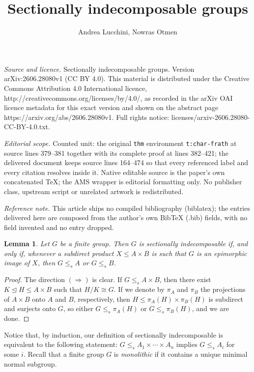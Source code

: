 \documentclass[10pt,a4paper]{amsart}
\newtheorem{lemma}[thm]{Lemma}
\begin{document}
\title[Sectionally indecomposable groups]{Sectionally indecomposable groups}
\author{Andrea Lucchini, Nowras Otmen}
\date{}
\maketitle
\noindent\emph{Source and licence.} Sectionally indecomposable groups. Version arXiv:2606.28080v1 (CC BY 4.0). This material is distributed under the Creative Commons Attribution 4.0 International licence, http://creativecommons.org/licenses/by/4.0/, as recorded in the arXiv OAI licence metadata for this exact version and shown on the abstract page https://arxiv.org/abs/2606.28080v1. Full rights notice: licenses/arxiv-2606.28080-CC-BY-4.0.txt.\par\smallskip
\noindent\textit{Editorial scope.} Counted unit: the original \texttt{thm} environment \texttt{t:char-frath} at source lines 379--381 together with its complete proof at lines 382--421; the delivered document keeps source lines 164--474 so that every referenced label and every citation resolves inside it. Native editable source is the paper's own concatenated TeX; the AMS wrapper is editorial formatting only. No publisher class, upstream script or unrelated artwork is redistributed.
\par\smallskip\noindent\textit{Reference note.} This article ships no compiled bibliography (biblatex); the entries delivered here are composed from the author's own BibTeX (.bib) fields, with no field invented and no entry dropped.
\begin{lemma}\label{l:strong_indec_subdirect}
    Let $G$ be a finite group. Then $G$ is sectionally indecomposable if, and only if, whenever a subdirect product $X \leq A \times B$ is such that $G$ is an epimorphic image of $X$, then $G \leq_s A$ or $G \leq_s B$.
\end{lemma}
\begin{proof}
    The direction $(\Rightarrow)$ is clear. If $G \leq_s A \times B$, then there exist $K \unlhd H \leq A \times B$ such that $H/K \cong G$. If we denote by $\pi_A$ and $\pi_B$ the projections of $A \times B$ onto $A$ and $B$, respectively, then $H \leq \pi_A(H) \times \pi_B(H)$ is subdirect and surjects onto $G$, so either $G \leq_s \pi_A(H)$ or $G \leq_s \pi_B(H)$, and we are done.
\end{proof}

Notice that, by induction, our definition of sectionally indecomposable is equivalent to the following statement: $G \leq_s A_1 \times \cdots \times A_n$ implies $G \leq_s A_i$ for some $i$. Recall that a finite group $G$ is \emph{monolithic} if it contains a unique minimal normal subgroup.
\end{document}
